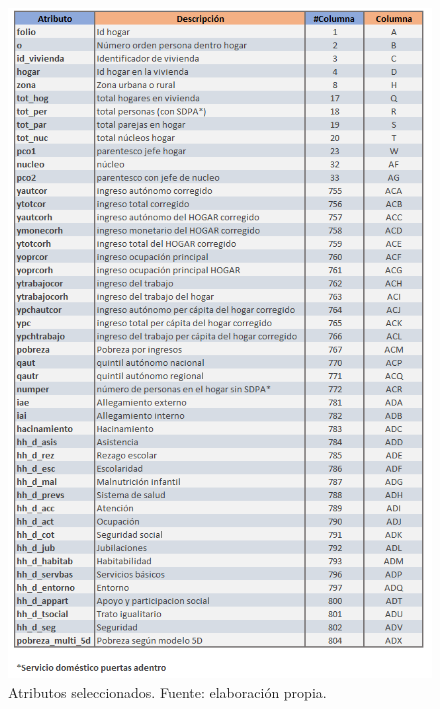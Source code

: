 \documentclass[12pt,letterpaper,spanish]{article}
\begin{document}
 \begin{figure} [H]
        \centering
        \includegraphics[height=\textheight]{atributos_casen.png}
        \caption{Atributos seleccionados. Fuente: elaboración propia.}
        \label{atributos}
    \end{figure}
\end{document}
